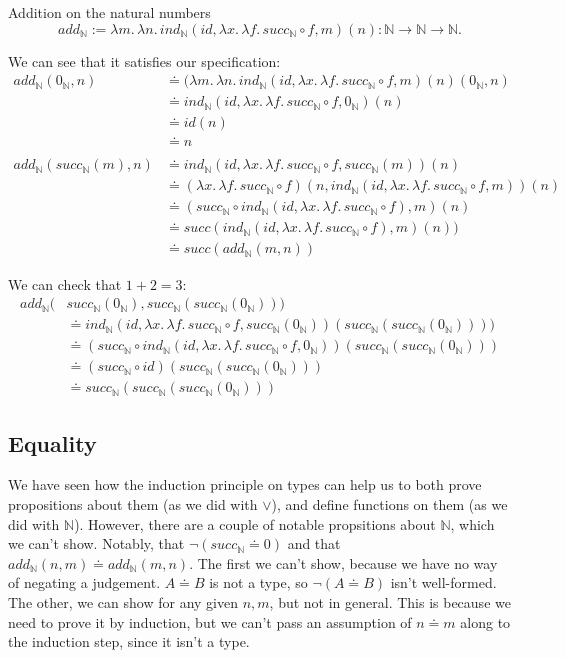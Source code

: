 \documentclass[a4paper, 12pt]{article}
\newcommand{\N}{\mathbb{N}}
\newcommand{\la}[1]{\lambda{#1}.\,}
\theoremstyle{changedot}
\theoremstyle{changedotbreak}
\theoremstyle{nonumberplain}
\begin{document}
\begin{definition}
  Addition on the natural numbers
  \[add_{\N} := \la m \la n ind_{\N}(id, \la x \la f succ_{\N} \circ f, m)(n) : \N \to \N \to \N.\]
\end{definition}

We can see that it satisfies our specification:
\begin{align*}
  add_{\N}(0_{\N}, n) &\doteq (\la m \la n ind_{\N}(id, \la x \la f succ_{\N} \circ f, m)(n)(0_{\N}, n) \\
  &\doteq ind_{\N}(id, \la x \la f succ_{\N} \circ f, 0_{\N})(n) \\
                 &\doteq id(n) \\
                 &\doteq n \\ \\
  add_{\N}(succ_{\N}(m), n) &\doteq ind_{\N}(id, \la x \la f succ_{\N} \circ f, succ_{\N}(m))(n) \\
                 &\doteq (\la x \la f succ_{\N} \circ f)(n, ind_{\N}(id, \la x \la f succ_{\N} \circ f, m))(n) \\
                 &\doteq (succ_{\N} \circ ind_{\N}(id, \la x \la f succ_{\N} \circ f), m)(n) \\
                 &\doteq succ(ind_{\N}(id, \la x \la f succ_{\N} \circ f), m)(n)) \\
  &\doteq succ(add_{\N}(m, n))
\end{align*}

We can check that $1+2=3$:
\begin{align*}
  add_{\N}(&succ_{\N}(0_{\N}), succ_{\N}(succ_{\N}(0_{\N}))) \\
           &\doteq ind_{\N}(id, \la x \la f succ_{\N} \circ f, succ_{\N}(0_{\N}))(succ_{\N}(succ_{\N}(0_{\N})))) \\
  &\doteq (succ_{\N}\circ ind_{\N}(id, \la x \la f succ_{\N} \circ f, 0_{\N}))(succ_{\N}(succ_{\N}(0_{\N}))) \\
           &\doteq (succ_{\N} \circ id)(succ_{\N}(succ_{\N}(0_{\N}))) \\
  &\doteq succ_{\N}(succ_{\N}(succ_{\N}(0_{\N})))
\end{align*}

\subsection{Equality}
We have seen how the induction principle on types can help us to both prove propositions about them (as we did with $\lor$), and define functions on them (as we did with $\N$). However, there are a couple of notable propsitions about $\N$, which we can't show. Notably, that $\neg(succ_{\N} \doteq 0)$ and that $add_{\N}(n, m) \doteq add_{\N}(m, n)$. The first we can't show, because we have no way of negating a judgement. $A \doteq B$ is not a type, so $\neg (A \doteq B)$ isn't well-formed. The other, we can show for any given $n, m$, but not in general. This is because we need to prove it by induction, but we can't pass an assumption of $n\doteq m$ along to the induction step, since it isn't a type.
\end{document}
